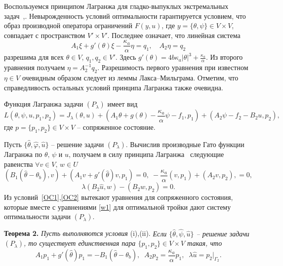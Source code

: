 \documentclass[12pt]{article}
\begin{document}
    Воспользуемся принципом 
   Лагранжа для гладко-выпуклых экстремальных задач~\cite{10},\cite{11}. Невырожденность условий оптимальности гарантируется условием, что
образ производной
    оператора ограничений $F(y, u)$, где $y=\{\theta,\psi\}\in V\times V$,
    совпадает с пространством $V'\times V'.$  Последнее означает, что
    линейная система
    $$
    A_1\xi+g'(\theta)\xi-\frac{\kappa_a}{\alpha}\eta=q_1,\quad
    A_2\eta=q_2
    $$
разрешима для всех $\theta\in V$, $q_1,q_2\in V'.$ Здесь
$g'(\theta)=4b\kappa_a|\theta|^3+\frac{\kappa_a}{\alpha}.$
Из второго уравнения получаем $\eta=A_2^{-1}q_2.$ Разрешимость первого уравнения при известном $\eta\in V$ очевидным образом следует из леммы Лакса--Мильграма. Отметим, что справедливость остальных условий принципа Лагранжа также очевидна.

Функция Лагранжа задачи $(P_\lambda)$
имеет вид
    \[
        L(\theta, \psi, u, p_1, p_2) = J_\lambda(\theta, u)
        + (A_1\theta+g(\theta)-\frac{\kappa_a}{\alpha}\psi-f_1 ,p_1)+
      (A_2\psi-f_2-B_2u,p_2),
    \]
  где $p=\{p_1,p_2\}\in V\times V$ -- сопряженное состояние.
 
 Пусть $\{\hat{\theta}, \hat{\varphi}, \hat{u} \}$ -- решение задачи 
 $(P_\lambda)$. Вычислив производные Гато функции Лагранжа по $\theta,\,\psi$ и $u$, получаем
    в силу принципа Лагранжа~\cite[Теорема 1.5]{10} следующие равенства
    $\forall v\in V,\, w\in U$ 
    \begin{equation}
        \label{OC1}
        (B_1(\hat{\theta} -\theta_b), v) + (A_1v+g'(\hat{\theta})v,p_1)=0,\;
    -\frac{\kappa_a}{\alpha}(v ,p_1)+
      (A_2v,p_2),    = 0,
    \end{equation}
    \begin{equation}
        \label{OC2}
        \lambda(B_2\hat{u},w) - (B_2w, p_2) = 0.
    \end{equation}
    Из условий~\eqref{OC1},\eqref{OC2} вытекают уравнения для сопряженного состояния, которые вместе с уравнениями \eqref{w1}
    для оптимальной тройки дают систему оптимальности задачи $(P_\lambda)$.

    \textbf{Теорема 2.}
    {\it Пусть выполняются условия} (i),(ii).
        {\it Если $\{\hat{\theta}, \hat{\psi}, \hat{u}\}$ -- решение
    задачи $(P_\lambda)$, то существует единственная пара $\{p_1, p_2 \} \in V\times V$
        такая, что}
    \begin{equation}
        \label{AS}
   A_1p_1+g'(\hat{\theta}) p_1=-B_1(\hat{\theta} -\theta_b),\;\;
   A_2p_2=\frac{\kappa_a}{\alpha}p_1,\;\;
   \lambda\hat{u}=p_2|_{\Gamma_2}.
    \end{equation}
 
\end{document}
